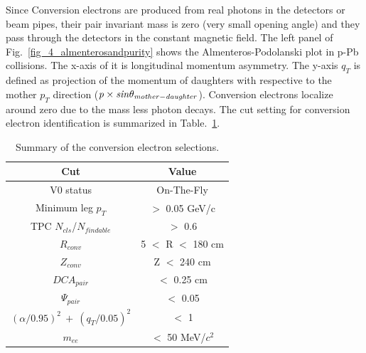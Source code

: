 Since Conversion electrons are produced from real photons in the detectors or beam pipes, their pair invariant mass is zero (very small opening angle) and they pass through the detectors in the constant magnetic field.  
The left panel of Fig.~\ref{fig_4_almenterosandpurity} shows the Almenteros-Podolanski plot in p-Pb collisions.
The x-axis of it is longitudinal momentum asymmetry. 
The y-axis $q_{T}$ is defined as projection of the momentum of daughters with respective to the mother $p_{T}$ direction ($\it{p}\times sin\theta_{mother-daughter}$). 
Conversion electrons localize around zero due to the mass less photon decays.  
The cut setting for conversion electron identification is summarized in Table.~\ref{table_convcut}.
\begin{table}[!h]
  \centering
  \begin{tabular}{cc} \hline
    Cut  & Value \\ \hline
    V0 status  & On-The-Fly \\ 
    Minimum leg $p_{T}$  & $>$ 0.05 GeV/c \\ 
    TPC $N_{cls}$/$N_{findable}$ & $>$ 0.6 \\ 
    $R_{conv}$  & 5 $<$ R $<$ 180 cm \\
    $Z_{conv}$  & Z $<$ 240 cm \\ 
    $DCA_{pair}$  & $<$ 0.25 cm\\ 
    $\Psi_{pair}$  & $<$ 0.05 \\ 
    $(\alpha/0.95)^{2}~+~(q_{T}/0.05)^{2}$  & $<$ 1 \\ 
    $m_{ee}$  & $<$ 50 MeV/$c^{2}$ \\ \hline
  \end{tabular}  
  \label{table_convcut}
  \caption{Summary of the conversion electron selections. }
\end{table}

